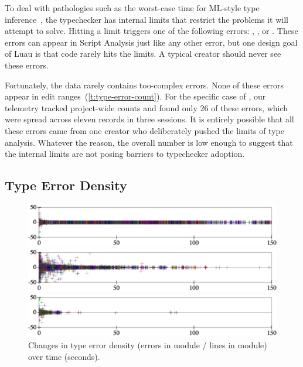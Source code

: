 \documentclass[english,submission,cleveref]{programming}
\begin{document}
To deal with pathologies such as the worst-case time for ML-style type
inference~\cite{m-popl-1990,ktu-caap-1990}, the typechecker
has internal limits that restrict the problems it will attempt to solve.
Hitting a limit triggers one of the following errors:
,
, or
.
These errors can appear in Script Analysis just like any other
error, but one design goal of Luau is that code rarely hits the limits.
A typical creator should never see these errors.

Fortunately, the data rarely contains too-complex errors.
None of these errors appear in edit ranges~(\cref{t:type-error-count}).
For the specific case of , our telemetry tracked project-wide
counts and found only 26 of these errors, which were spread across eleven
records in three sessions.
It is entirely possible that all these errors came from one creator who
deliberately pushed the limits of type analysis.
Whatever the reason, the overall number is low enough to suggest that the
internal limits are not posing barriers to typechecker adoption.


\subsection{Type Error Density}

\begin{figure}[t]\centering

  \mnocheck{}
  \includegraphics[width=\columnwidth]{img/error-count-nocheck-row--te-density-diff.pdf}
  \smallskip

  \mnonstrict{}
  \includegraphics[width=\columnwidth]{img/error-count-nonstrict-row--te-density-diff.pdf}
  \smallskip

  \mstrict{}
  \includegraphics[width=\columnwidth]{img/error-count-strict-row--te-density-diff.pdf}
  \caption{Changes in type error density (errors in module / lines in module) over time (seconds).}
  \label{f:error-density}
\end{figure}
\end{document}
